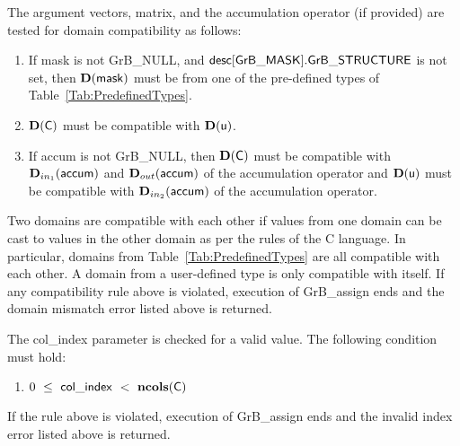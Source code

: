 The argument vectors, matrix, and the accumulation 
operator (if provided) are tested for domain compatibility as follows:
\begin{enumerate}
	\item If {\sf mask} is not {\sf GrB\_NULL}, and ${\sf desc[GrB\_MASK].GrB\_STRUCTURE}$
    is not set, then $\bold{D}({\sf mask})$ must be from one of the pre-defined types of 
    Table~\ref{Tab:PredefinedTypes}.

	\item $\bold{D}({\sf C})$ must be 
    compatible with $\bold{D}({\sf u})$.

	\item If {\sf accum} is not {\sf GrB\_NULL}, then $\bold{D}({\sf C})$ must be
    compatible with $\mbox{$\mathbf{D}_{in_{1}}$}({\sf accum})$ and $\mbox{$\mathbf{D}_{out}$}({\sf accum})$ of the accumulation operator and 
    $\bold{D}({\sf u})$ must be compatible with $\mbox{$\mathbf{D}_{in_{2}}$}({\sf accum})$ of the accumulation operator.
\end{enumerate}
Two domains are compatible with each other if values from one domain can be cast 
to values in the other domain as per the rules of the C language.
In particular, domains from Table~\ref{Tab:PredefinedTypes} are all compatible 
with each other. A domain from a user-defined type is only compatible with itself.
If any compatibility rule above is violated, execution of {\sf GrB\_assign} ends
and the domain mismatch error listed above is returned.

The {\sf col\_index} parameter is checked for a valid value.  The following
condition must hold:
\begin{enumerate}
	\item $0\ \leq\ {\sf col\_index} \ <\ \bold{ncols}({\sf C})$
\end{enumerate}
If the rule above is violated, execution of {\sf GrB\_assign} ends 
and the invalid index error listed above is returned.

